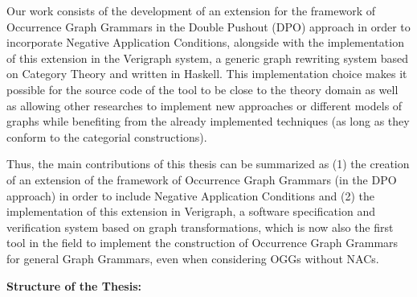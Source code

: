Our work consists of the development of an extension for the framework of Occurrence Graph Grammars in the Double Pushout (DPO) approach in order to incorporate Negative Application Conditions, alongside with the implementation of this extension in the Verigraph system, a generic graph rewriting system based on Category Theory and written in Haskell.
This implementation choice makes it possible for the source code of the tool to be close to the theory domain as well as allowing other researches to implement new approaches or different models of graphs while benefiting from the already implemented techniques (as long as they conform to the categorial constructions).



Thus, the main contributions of this thesis can be summarized as (1) the creation of an extension of the framework of Occurrence Graph Grammars (in the DPO approach) in order to include Negative Application Conditions and (2) the implementation of this extension in Verigraph, a software specification and verification system based on graph transformations, which is now also the first tool in the field to implement the construction of Occurrence Graph Grammars for general Graph Grammars, even when considering OGGs without NACs.

\hfill \break
\textbf{Structure of the Thesis:}

